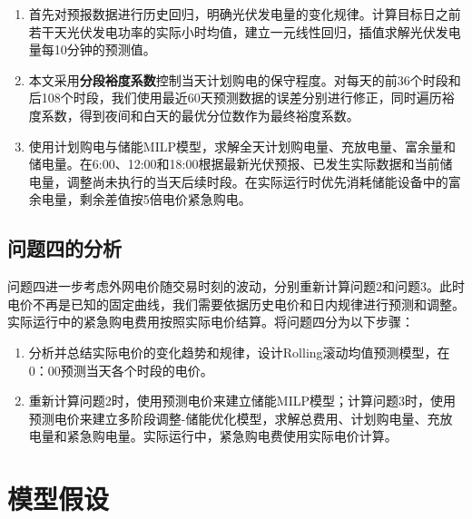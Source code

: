 \documentclass[UTF8]{ctexart}
\begin{document}
    \begin{enumerate}[label=(\arabic*),leftmargin=2.8em]
        \item 首先对预报数据进行历史回归，明确光伏发电量的变化规律。计算目标日之前若干天光伏发电功率的实际小时均值，建立一元线性回归，插值求解光伏发电量每10分钟的预测值。
        \item 本文采用\textbf{分段裕度系数}控制当天计划购电的保守程度。对每天的前36个时段和后108个时段，我们使用最近60天预测数据的误差分别进行修正，同时遍历裕度系数，得到夜间和白天的最优分位数作为最终裕度系数。
        
        \item 使用计划购电与储能MILP模型，求解全天计划购电量、充放电量、富余量和储电量。在6:00、12:00和18:00根据最新光伏预报、已发生实际数据和当前储电量，调整尚未执行的当天后续时段。在实际运行时优先消耗储能设备中的富余电量，剩余差值按5倍电价紧急购电。
    \end{enumerate}
    
    \subsection{问题四的分析}
    
    问题四进一步考虑外网电价随交易时刻的波动，分别重新计算问题2和问题3。此时电价不再是已知的固定曲线，我们需要依据历史电价和日内规律进行预测和调整。实际运行中的紧急购电费用按照实际电价结算。将问题四分为以下步骤：
    
    \begin{enumerate}[label=(\arabic*),leftmargin=2.8em]
        \item 分析并总结实际电价的变化趋势和规律，设计Rolling滚动均值预测模型，在0：00预测当天各个时段的电价。
        
        \item 重新计算问题2时，使用预测电价来建立储能MILP模型；计算问题3时，使用预测电价来建立多阶段调整-储能优化模型，求解总费用、计划购电量、充放电量和紧急购电量。实际运行中，紧急购电费使用实际电价计算。
    \end{enumerate}
    
    \section{模型假设}
    
\end{document}
